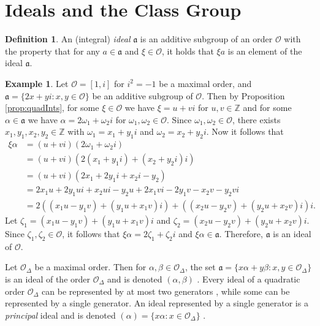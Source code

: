 \documentclass{ucalgthes1}
\theoremstyle{definition}
\newtheorem{defn}[thm]{Definition}
\newtheorem{example}[thm]{Example}
\newcommand{\ZZ}{\mathbb{Z}}
\newcommand{\OO}{\mathcal{O}}
\newcommand{\ideal}{\mathfrak}
\begin{document}
\section{Ideals and the Class Group}
\label{sec:classGroup}

\begin{defn} \cite[Definition 4.20]{Jacobson2009}
An (integral) \emph{ideal} $\ideal a$ is an additive subgroup of an order $\OO$ with the property that for any $a \in \ideal a$ and $\xi \in \OO$, it holds that $\xi a$ is an element of the ideal $\ideal a$.
\end{defn}

\begin{example}
Let $\OO = [1, i]$ for $i^2 = -1$ be a maximal order, and $\ideal a = \{2 x + y i : x, y \in \OO\}$ be an additive subgroup of $\OO$.  Then by Proposition \ref{prop:quadInts}, for some $\xi \in \OO$ we have $\xi = u + v i$ for $u,v \in \ZZ$ and for some $\alpha \in \ideal a$ we have $\alpha = 2 \omega_1 + \omega_2 i$ for $\omega_1, \omega_2 \in \OO$.  Since $\omega_1, \omega_2 \in \OO$, there exists $x_1, y_1, x_2, y_2 \in \ZZ$ with $\omega_1 = x_1 + y_1 i$ and $\omega_2 = x_2 + y_2 i$.  Now it follows that
\begin{align*}
\xi \alpha &= (u + v i)(2 \omega_1 + \omega_2 i) \\
&= (u + v i)(2 (x_1 + y_1 i) + (x_2 + y_2 i) i) \\
&= (u + v i)(2 x_1 + 2 y_1 i + x_2 i - y_2) \\
&= 2 x_1 u + 2 y_1 u i + x_2 u i - y_2 u
 + 2 x_1 v i - 2 y_1 v - x_2 v - y_2 v i \\
&= 2 ((x_1 u - y_1 v) + (y_1u + x_1v)i) + ((x_2 u - y_2 v) + (y_2 u + x_2 v) i) i.
\end{align*}
Let $\zeta_1 = (x_1 u - y_1 v) + (y_1u + x_1v)i$ and $\zeta_2 = (x_2 u - y_2 v) + (y_2 u + x_2 v) i$.  Since $\zeta_1, \zeta_2 \in \OO$, it follows that $\xi \alpha = 2 \zeta_1 + \zeta_2 i$ and $\xi \alpha \in \ideal a$.  Therefore, $\ideal a$ is an ideal of $\OO$.
\end{example}


Let $\OO_\Delta$ be a maximal order.  Then for $\alpha, \beta \in \OO_\Delta$, the set $\ideal a = \{x \alpha + y \beta : x, y \in \OO_\Delta\}$ is an ideal of the order $\OO_\Delta$ and is denoted $(\alpha, \beta)$ \cite[p.16]{Ramachandran2006}.  Every ideal of a quadratic order $\OO_\Delta$ can be represented by at most two generators \cite[p.125--126]{Cohn1980}, while some can be represented by a single generator.  An ideal represented by a single generator is a \emph{principal} ideal and is denoted $(\alpha) = \{ x \alpha : x \in \OO_\Delta \}$ \cite[p.87]{Jacobson2009}.
\end{document}

